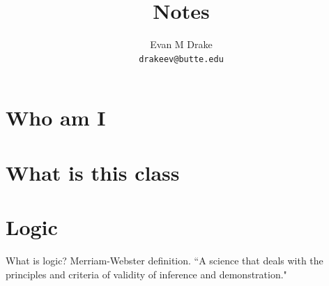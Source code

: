 \documentclass[12pt]{article}
\title{Notes}
\author{
	Evan M Drake \\
	\texttt{drakeev@butte.edu}
}
\begin{document}
	\maketitle
	\tableofcontents

	\newpage


	\section{Who am I}
	\section{What is this class}
	\section{Logic}
	What is logic?
	Merriam-Webster definition.
	``A science that deals with the principles and criteria of validity of inference and demonstration."
	


	\nocite{*}

	\newpage %
	\backmatter
	\printbibliography

	\newpage %
	\printindex

	\newpage %
	\appendix
\end{document}
